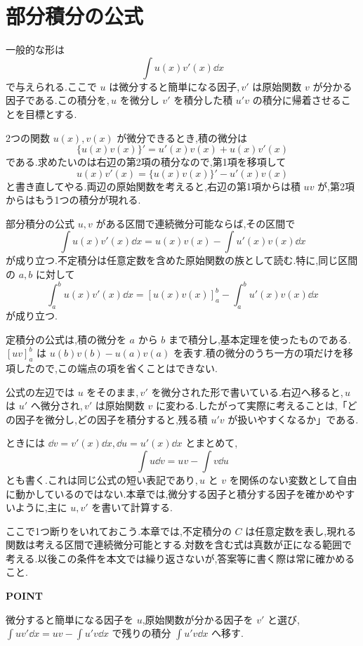 \section{部分積分の公式}\label{節:部分積分の導出}

一般的な形は
\[
 \int u(x)v'(x)\dd x
\]
で与えられる.ここで $u$ は微分すると簡単になる因子,\,$v'$ は原始関数 $v$ が分かる因子である.この積分を,\,$u$ を微分し $v'$ を積分した積 $u'v$ の積分に帰着させることを目標とする.

2つの関数 $u(x),v(x)$ が微分できるとき,積の微分は
\[
 \{u(x)v(x)\}'=u'(x)v(x)+u(x)v'(x)
\]
である.求めたいのは右辺の第2項の積分なので,第1項を移項して
\[
 u(x)v'(x)=\{u(x)v(x)\}'-u'(x)v(x)
\]
と書き直してやる.両辺の原始関数を考えると,右辺の第1項からは積 $uv$ が,第2項からはもう1つの積分が現れる.

\begin{theorem}{部分積分の公式}
$u,v$ がある区間で連続微分可能ならば,その区間で
\[
 \int u(x)v'(x)\dd x
 =u(x)v(x)-\int u'(x)v(x)\dd x
\]
が成り立つ.不定積分は任意定数を含めた原始関数の族として読む.特に,同じ区間の $a,b$ に対して
\[
 \int_a^b u(x)v'(x)\dd x
 =[u(x)v(x)]_a^b-\int_a^b u'(x)v(x)\dd x
\]
が成り立つ.
\end{theorem}

定積分の公式は,積の微分を $a$ から $b$ まで積分し,基本定理を使ったものである.\,$[uv]_a^b$ は $u(b)v(b)-u(a)v(a)$ を表す.積の微分のうち一方の項だけを移項したので,この端点の項を省くことはできない.

公式の左辺では $u$ をそのまま,\,$v'$ を微分された形で書いている.右辺へ移ると,\,$u$ は $u'$ へ微分され,\,$v'$ は原始関数 $v$ に変わる.したがって実際に考えることは,「どの因子を微分し,どの因子を積分すると,残る積 $u'v$ が扱いやすくなるか」である.

ときには $\dd v=v'(x)\dd x$,\,$\dd u=u'(x)\dd x$ とまとめて,
\[
 \int u\dd v=uv-\int v\dd u
\]
とも書く.これは同じ公式の短い表記であり,\,$u$ と $v$ を関係のない変数として自由に動かしているのではない.本章では,微分する因子と積分する因子を確かめやすいように,主に $u,v'$ を書いて計算する.

ここで1つ断りをいれておこう.本章では,不定積分の $C$ は任意定数を表し,現れる関数は考える区間で連続微分可能とする.対数を含む式は真数が正になる範囲で考える.以後この条件を本文では繰り返さないが,答案等に書く際は常に確かめること.

\begin{bookpoint}
\textbf{POINT}\par
微分すると簡単になる因子を $u$,原始関数が分かる因子を $v'$ と選び,\,$\int uv'\dd x=uv-\int u'v\dd x$ で残りの積分 $\int u'v\dd x$ へ移す.
\end{bookpoint}

